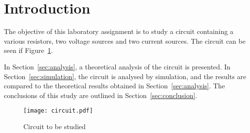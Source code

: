 \section{Introduction}
\label{sec:introduction}

The objective of this laboratory assignment is to study a circuit containing a
various resistors, two voltage sources and two current sources. The circuit can be seen if Figure~\ref{fig:circuit}.


In Section~\ref{sec:analysis}, a theoretical analysis of the circuit is
presented. In Section~\ref{sec:simulation}, the circuit is analysed by
simulation, and the results are compared to the theoretical results obtained in
Section~\ref{sec:analysis}. The conclusions of this study are outlined in
Section~\ref{sec:conclusion}.

\begin{figure}[H] \centering
\texttt{[image: circuit.pdf]}
\caption{Circuit to be studied}
\label{fig:circuit}
\end{figure}

